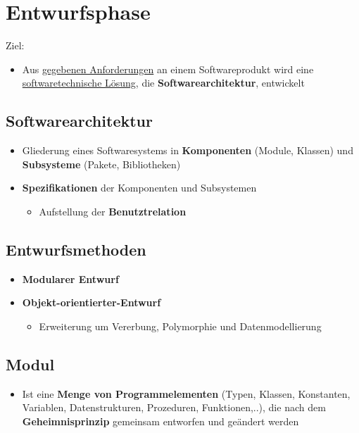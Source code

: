 \section{Entwurfsphase}
	
Ziel:
\begin{itemize}
\item Aus \underline{gegebenen Anforderungen} an einem Softwareprodukt wird eine \newline \underline{softwaretechnische Lösung}, die \textbf{Softwarearchitektur}, entwickelt
\end{itemize}
	
\subsection{Softwarearchitektur}
		
\begin{itemize}
\item Gliederung eines Softwaresystems in \textbf{Komponenten} (Module, Klassen) und \textbf{Subsysteme} (Pakete, Bibliotheken)
\item \textbf{Spezifikationen} der Komponenten und Subsystemen
\begin{itemize}
\item Aufstellung der \textbf{Benutztrelation}
\end{itemize}
\end{itemize}
	
\subsection{Entwurfsmethoden}
		
\begin{itemize}
\item \textbf{Modularer Entwurf}
\item \textbf{Objekt-orientierter-Entwurf}
\begin{itemize}
\item Erweiterung um Vererbung, Polymorphie und Datenmodellierung
\end{itemize}
\end{itemize}

\subsection{Modul}

\begin{itemize}
	\item Ist eine \textbf{Menge von Programmelementen} (Typen, Klassen, Konstanten, Variablen, Datenstrukturen, Prozeduren, Funktionen,..), die nach dem \textbf{Geheimnisprinzip} gemeinsam entworfen und geändert werden
\end{itemize}

